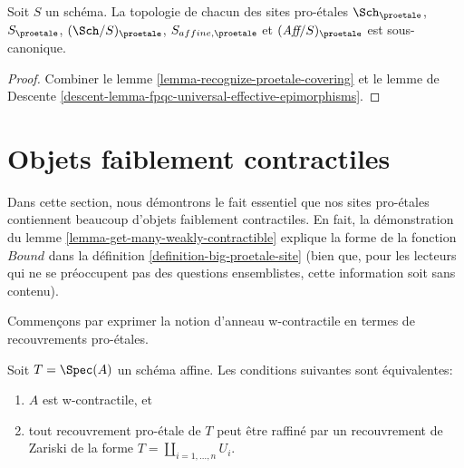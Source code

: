 \begin{lemma}
\label{lemma-proetale-subcanonical}
Soit $S$ un schéma. La topologie de chacun des sites pro-\'etales
$\Sch_\proetale$, $S_\proetale$, $(\Sch/S)_\proetale$,
$S_{affine, \proetale}$ et $(\textit{Aff}/S)_\proetale$ est sous-canonique.
\end{lemma}

\begin{proof}
Combiner le lemme \ref{lemma-recognize-proetale-covering} et le
lemme de Descente \ref{descent-lemma-fpqc-universal-effective-epimorphisms}.
\end{proof}





\section{Objets faiblement contractiles}
\label{section-weakly-contractible}

\noindent
Dans cette section, nous démontrons le fait essentiel que nos sites pro-\'etales
contiennent beaucoup d'objets faiblement contractiles. En fait, la démonstration du
lemme \ref{lemma-get-many-weakly-contractible} explique la forme de la fonction
$Bound$ dans la
définition \ref{definition-big-proetale-site} (bien que, pour les lecteurs
qui ne se préoccupent pas des questions ensemblistes, cette information
soit sans contenu).

\noindent
Commençons par exprimer la notion d'anneau w-contractile en termes de
recouvrements pro-\'etales.

\begin{lemma}
\label{lemma-w-contractible-proetale-cover}
Soit $T = \Spec(A)$ un schéma affine. Les conditions suivantes sont équivalentes:
\begin{enumerate}
\item $A$ est w-contractile, et
\item tout recouvrement pro-\'etale de $T$ peut être raffiné par
un recouvrement de Zariski de la forme $T = \coprod_{i = 1, \ldots, n} U_i$.
\end{enumerate}
\end{lemma}

